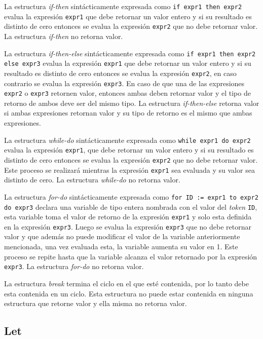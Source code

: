 \documentclass{article}
\begin{document}
La estructura \emph{if-then} sintácticamente expresada como 
\verb|if expr1 then expr2| evalua la expresión \verb|expr1| que debe retornar
un valor entero y si su resultado es distinto de cero entonces se evalua la
expresión \verb|expr2| que no debe retornar valor. La estructura \emph{if-then}
no retorna valor.

La estructura \emph{if-then-else} sintácticamente expresada como
\verb|if expr1 then expr2 else expr3| evalua la expresión \verb|expr1| que debe
retornar un valor entero y si su resultado es distinto de cero entonces se
evalua la expresión \verb|expr2|, en caso contrario se evalua la expresión
\verb|expr3|. En caso de que una de las expresiones \verb|expr2| o \verb|expr3|
retornen valor, entonces ambas deben retornar valor y el tipo de retorno de
ambos deve ser del mismo tipo. La estructura \emph{if-then-else} retorna valor
si ambas expresiones retornan valor y su tipo de retorno es el mismo que ambas
expresiones.

La estructura \emph{while-do} sintácticamente expresada como 
\verb|while expr1 do expr2| evalua la expresión \verb|expr1|, que debe retornar
un valor entero y si su resultado es distinto de cero entonces se evalua la
expresión \verb|expr2| que no debe retornar valor. Este proceso se realizará
mientras la expresión \verb|expr1| sea evaluada y su valor sea distinto de cero.
La estructura  \emph{while-do} no retorna valor.

La estructura  \emph{for-do} sintácticamente expresada como
\verb|for ID := expr1 to expr2 do expr3| declara una variable de tipo entera
nombrada con el valor del \emph{token} \verb|ID|, esta variable toma el valor
de retorno de la expresión \verb|expr1| y solo esta definida en la expresión
\verb|expr3|. Luego se evalua la expresión \verb|expr3| que no debe retornar
valor y que además no puede modificar el valor de la variable anteriormente
mencionada, una vez evaluada esta, la variable aumenta su valor en 1. Este
proceso se repite hasta que la variable alcanza el valor retornado por la
expresión \verb|expr3|. La estructura \emph{for-do} no retorna valor.

La estructura \emph{break} termina el ciclo en el que esté contenida, por lo
tanto debe esta contenida en un ciclo. Esta estructura no puede estar contenida
en ninguna estructura que retorne valor y ella misma no retorna valor.

\subsection{Let}
\end{document}
